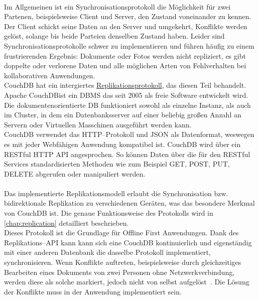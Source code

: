 \\
Im Allgemeinen ist ein Synchronisationsprotokoll die Möglichkeit für zwei Partenen, beispielsweise Client und Server, den Zustand voneinander zu kennen. Der Client schickt seine Daten an den Server und umgekehrt, Konflikte werden gelöst, solange bis beide Parteien denselben Zustand haben.
Leider sind Synchronisationsprotokolle schwer zu implementieren und führen häufig zu einem frustrierenden Ergebnis: Dokumente oder Fotos werden nicht repliziert, es gibt doppelte oder verlorene Daten und alle möglichen Arten von Fehlverhalten bei kollaborativen Anwendungen.\\
CouchDB hat ein intergiertes \hyperref[chap:replication]{Replikationsprotokoll}, das diesen Teil behandelt.  
%
%
Apache CouchDB\tm ist ein \gls{DBMS} das seit 2005 als freie Software entwickelt wird. Die dokumentenorientierte \gls{DB} funktioniert sowohl als einzelne Instanz, als auch im Cluster, in dem ein Datenbanksserver auf einer beliebig großen Anzahl an Servern oder Virtuellen Masschinen ausgeführt werden kann.\\
CouchDB verwendet das \gls{HTTP}--Protokoll und \gls{JSON} als Datenformat, weswegen es mit jeder Webfähigen Anwendung kompatibel ist. CouchDB wird über ein \gls{REST}ful \gls{HTTP} \gls{API} angesprochen. So können Daten über die für den \gls{REST}ful Services standardisierten Methoden wie zum Beispiel GET, POST, PUT, DELETE abgerufen oder manipuliert werden.\\\\
Das implementierte Replikationsmodell erlaubt die Synchronisation bzw. bidirektionale Replikation zu verschiedenen Geräten, was das besondere Merkmal von CouchDB ist. 
Die genaue Funktionsweise des Protokolls wird in \autoref{chap:replication} detailliert beschrieben.\\
Dieses Protokoll ist die Grundlage für Offline First Anwendungen.
Dank des Replikations--\gls{API} kann kann sich eine CouchDB kontinuierlich und eigenständig mit einer anderen Datenbank die dasselbe Protokoll implementiert, synchronisieren.
Wenn Konflikte auftreten, beispielsweise durch gleichzeitiges Bearbeiten eines Dokuments von zwei Personen ohne Netzwerkverbindung, werden diese als solche markiert, jedoch nicht von selbst aufgelöst~\cite{couch}. Die Lösung der Konflikte muss in der Anwendung implementiert sein.
